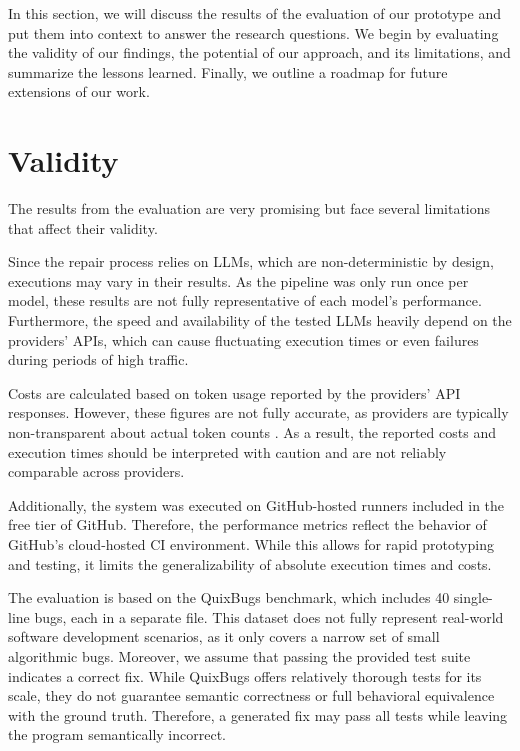 In this section, we will discuss the results of the evaluation of our prototype and put them into context to answer the research questions. We begin by evaluating the validity of our findings, the potential of our approach, and its limitations, and summarize the lessons learned. Finally, we outline a roadmap for future extensions of our work.

\section{Validity} \label{section:validity}

The results from the evaluation are very promising but face several limitations that affect their validity.

Since the repair process relies on LLMs, which are non-deterministic by design, executions may vary in their results. As the pipeline was only run once per model, these results are not fully representative of each model's performance. Furthermore, the speed and availability of the tested LLMs heavily depend on the providers' APIs, which can cause fluctuating execution times or even failures during periods of high traffic.

Costs are calculated based on token usage reported by the providers' API responses. However, these figures are not fully accurate, as providers are typically non-transparent about actual token counts \cite{sunCoInCountingInvisible2025d}. As a result, the reported costs and execution times should be interpreted with caution and are not reliably comparable across providers.

Additionally, the system was executed on GitHub-hosted runners included in the free tier of GitHub. Therefore, the performance metrics reflect the behavior of GitHub's cloud-hosted CI environment. While this allows for rapid prototyping and testing, it limits the generalizability of absolute execution times and costs.

The evaluation is based on the QuixBugs benchmark, which includes 40 single-line bugs, each in a separate file. This dataset does not fully represent real-world software development scenarios, as it only covers a narrow set of small algorithmic bugs. Moreover, we assume that passing the provided test suite indicates a correct fix. While QuixBugs offers relatively thorough tests for its scale, they do not guarantee semantic correctness or full behavioral equivalence with the ground truth. Therefore, a generated fix may pass all tests while leaving the program semantically incorrect.

